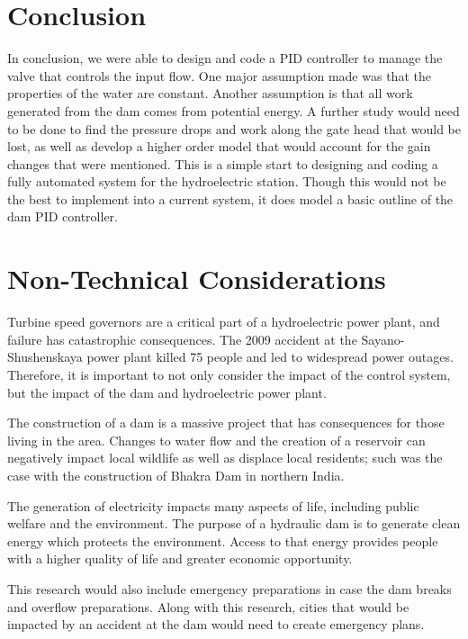 \documentclass{article}
\begin{document}
\begin{multicols*}{2}
        \section{Conclusion}
        
        In conclusion, we were able to design and code a PID controller to manage the valve that controls the input flow.  One major assumption made was that the properties of the water are constant.  Another assumption is that all work generated from the dam comes from potential energy.  A further study would need to be done to find the pressure drops and work along the gate head that would be lost, as well as develop a higher order model that would account for the gain changes that were mentioned. This is a simple start to designing and coding a fully automated system for the hydroelectric station.  Though this would not be the best to implement into a current system, it does model a basic outline of the dam PID controller.
        
        \pagebreak
        
        \section{Non-Technical Considerations}

        Turbine speed governors are a critical part of a hydroelectric power plant, and failure has catastrophic consequences. The 2009 accident at the Sayano-Shushenskaya power plant killed 75 people and led to widespread power outages. Therefore, it is important to not only consider the impact of the control system, but the impact of the dam and hydroelectric power plant.

        The construction of a dam is a massive project that has consequences for those living in the area. Changes to water flow and the creation of a reservoir can negatively impact local wildlife as well as displace local residents; such was the case with the construction of Bhakra Dam in northern India. 

        The generation of electricity impacts many aspects of life, including public welfare and the environment. The purpose of a hydraulic dam is to generate clean energy which protects the environment. Access to that energy provides people with a higher quality of life and greater economic opportunity.

        This research would also include emergency preparations in case the dam breaks and overflow preparations. Along with this research, cities that would be impacted by an accident at the dam would need to create emergency plans.


\end{multicols*}
\end{document}
